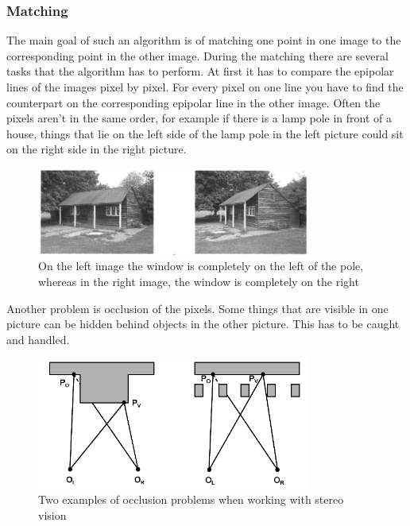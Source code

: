 \documentclass[a4paper]{article}
\begin{document}
\subsubsection{Matching}
The main goal of such an algorithm is of matching one
point in one image to the corresponding point in the other image. During the
matching there are several tasks that the algorithm has to perform. At
first it has to compare the epipolar lines of the images pixel by
pixel. For every pixel on one line you have to find the counterpart on
the corresponding epipolar line in the other image. Often the pixels aren't
in the same order, for example if
there is a lamp pole in front of a house, things that lie on
the left side of the lamp pole in the left picture could sit on the right
side in the right picture.

\begin{figure}
\centering
\includegraphics[width=0.8\textwidth]{matching_problems_direction}  
\caption{On the left image the window is completely on the left of the pole,
whereas in the right image, the window is completely on the right}
\end{figure}

Another problem is occlusion of the pixels. Some things that are
visible in one picture can be hidden behind objects in the other
picture. This has to be caught and handled.

\begin{figure}
\centering
\includegraphics[width=0.8\textwidth]{matching_problems_occlusion}
\caption{Two examples of occlusion problems when working with stereo vision}
\end{figure}
\end{document}

